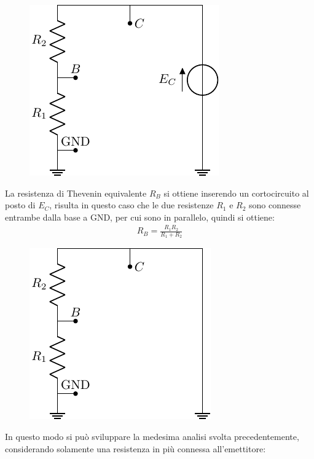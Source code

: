 \documentclass{article}
\numberwithin{equation}{subsection}
\begin{document}
\begin{figure}[H]%
    \centering
    \includegraphics{bjt-tensione-thevenin.pdf}%
    \label{fig:bjt-tensione-thevenin}
\end{figure}
La resistenza di Thevenin equivalente $R_B$ si ottiene inserendo un cortocircuito al posto di $E_C$, risulta in questo caso che le due resistenze 
$R_1$ e $R_2$ sono connesse entrambe dalla base a GND, per cui sono in parallelo, quindi si ottiene:
\begin{gather*}
    R_B=\displaystyle\frac{R_1R_2}{R_1+R_2}
\end{gather*}
\begin{figure}[H]%
    \centering
    \includegraphics{bjt-resistenza-thevenin.pdf}%
    \label{fig:bjt-resistenza-thevenin}
\end{figure}
In questo modo si può sviluppare la medesima analisi svolta precedentemente, considerando solamente una resistenza in più connessa all'emettitore:
\end{document}
